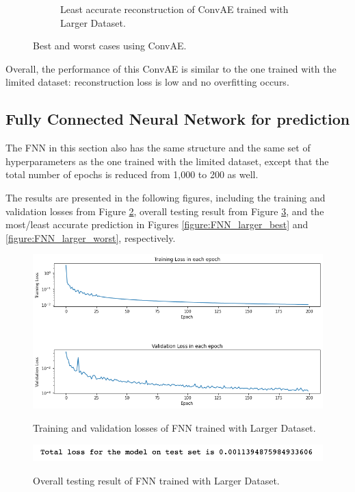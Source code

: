 \begin{figure}[H]
\begin{subfigure}{0.45\textwidth}
    \caption{Least accurate reconstruction of ConvAE trained with Larger Dataset.}
\end{subfigure}   
\caption{Best and worst cases using ConvAE.}
\label{figure:ConvAE_larger_best_worst}
\end{figure}

Overall, the performance of this ConvAE is similar to the one trained with the limited dataset: reconstruction loss is low and no overfitting occurs.


\subsection{Fully Connected Neural Network for prediction}

The FNN in this section also has the same structure and the same set of hyperparameters as the one trained with the limited dataset, except that the total number of epochs is reduced from 1,000 to 200 as well.

The results are presented in the following figures, including the training and validation losses from Figure \ref{figure:FNN_larger_losses}, overall testing result from Figure \ref{figure:FNN_larger_testing}, and the most/least accurate prediction in Figures \ref{figure:FNN_larger_best} and \ref{figure:FNN_larger_worst}, respectively.

\begin{figure}[H]
    \caption{Training and validation losses of FNN trained with Larger Dataset.}
    \includegraphics[scale=0.6]{figures/mantle_convection_images/larger_dataset/FNN_trainingData.png}
    \label{figure:FNN_larger_losses}
\end{figure}

\begin{figure}[H]
    \caption{Overall testing result of FNN trained with Larger Dataset.}
    \includegraphics[scale=0.8]{figures/mantle_convection_images/larger_dataset/FNN_OverallTesting.png}
    \label{figure:FNN_larger_testing}
\end{figure}

